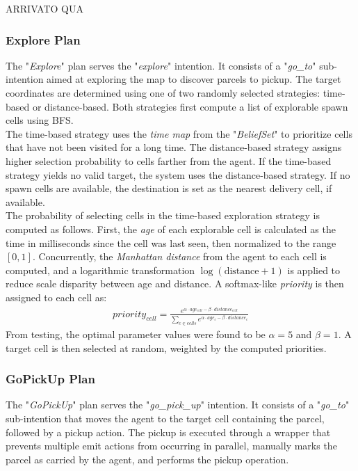        ARRIVATO QUA

        \subsubsection{Explore Plan}
            The "\textit{Explore}" plan serves the "\textit{explore}" intention. It consists of a "\textit{go\_to}" sub-intention aimed at exploring the map to discover parcels to pickup. The target coordinates are determined using one of two randomly selected strategies: time-based or distance-based. Both strategies first compute a list of explorable spawn cells using BFS.
            \medskip\\
            The time-based strategy uses the \textit{time map} from the "\textit{BeliefSet}" to prioritize cells that have not been visited for a long time. The distance-based strategy assigns higher selection probability to cells farther from the agent. If the time-based strategy yields no valid target, the system uses the distance-based strategy. If no spawn cells are available, the destination is set as the nearest delivery cell, if available.
            \medskip\\
            The probability of selecting cells in the time-based exploration strategy is computed as follows. First, the \textit{age} of each explorable cell is calculated as the time in milliseconds since the cell was last seen, then normalized to the range $[0, 1]$. Concurrently, the \textit{Manhattan distance} from the agent to each cell is computed, and a logarithmic transformation $\log(\text{distance} + 1)$ is applied to reduce scale disparity between age and distance. A softmax-like \textit{priority} is then assigned to each cell as:
            \begin{gather*}
                priority_{cell} = \frac{e^{\alpha \cdot age_{cell} - \beta \cdot distance_{cell}}}{\sum_{c \in cells}e^{\alpha \cdot age_c - \beta \cdot distance_c}}
            \end{gather*}
            From testing, the optimal parameter values were found to be $\alpha = 5$ and $\beta = 1$. A target cell is then selected at random, weighted by the computed priorities.

        \subsubsection{GoPickUp Plan}
            The "\textit{GoPickUp}" plan serves the "\textit{go\_pick\_up}" intention. It consists of a "\textit{go\_to}" sub-intention that moves the agent to the target cell containing the parcel, followed by a pickup action. The pickup is executed through a wrapper that prevents multiple emit actions from occurring in parallel, manually marks the parcel as carried by the agent, and performs the pickup operation.

